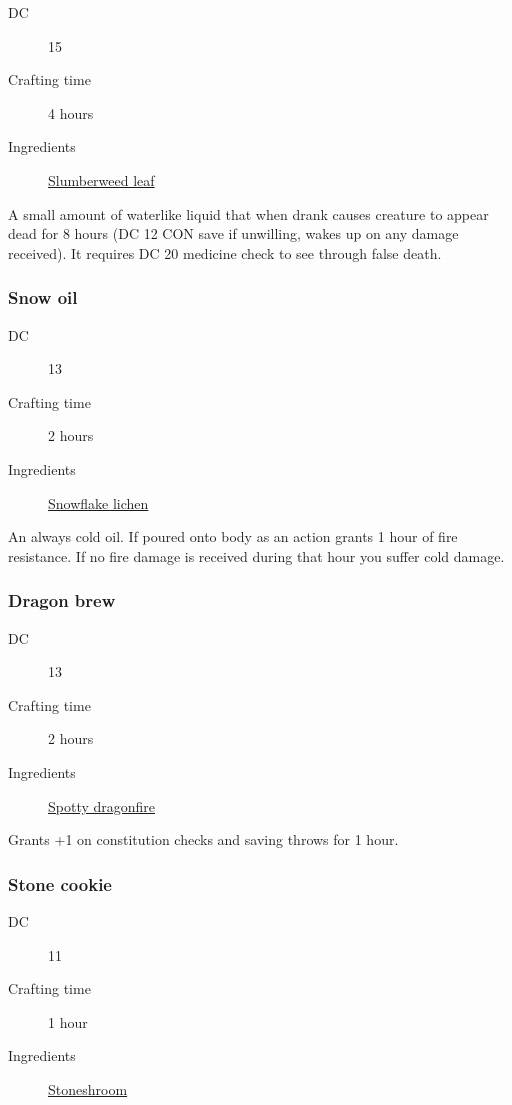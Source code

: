 \begin{description}
\item [DC] 15
\item [Crafting time] 4 hours
\item [Ingredients] \hyperref[Slumberweed]{Slumberweed leaf}
\end{description}

A small amount of waterlike liquid that when drank causes creature to appear dead for 
8 hours (DC 12 CON save if unwilling, wakes up on any damage received). 
It requires DC 20 medicine check to see through false death.

\subsubsection{Snow oil}
\label{Snow oil}

\begin{description}
\item [DC] 13
\item [Crafting time] 2 hours
\item [Ingredients] \hyperref[Snowflake Lichen]{Snowflake lichen}
\end{description}

An always cold oil. If poured onto body as an action grants 1 hour of fire resistance. 
If no fire damage is received during that hour you suffer  cold damage.

\subsubsection{Dragon brew}
\label{Dragon brew}

\begin{description}
\item [DC] 13
\item [Crafting time] 2 hours
\item [Ingredients] \hyperref[Spotty Dragonfire]{Spotty dragonfire}
\end{description}

Grants +1 on constitution checks and saving throws for 1 hour.

\subsubsection{Stone cookie}
\label{Stone cookie}

\begin{description}
\item [DC] 11
\item [Crafting time] 1 hour
\item [Ingredients] \hyperref[Stoneshrooms]{Stoneshroom}
\end{description}

